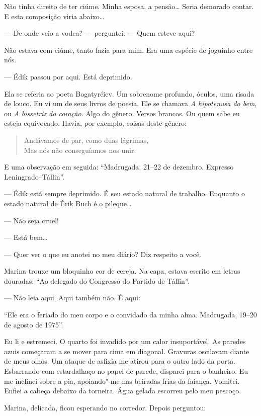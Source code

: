 Não tinha direito de ter ciúme. Minha esposa, a pensão\ldots{} Seria demorado
contar. E esta composição viria abaixo\ldots{}

--- De onde veio a vodca? --- perguntei. --- Quem esteve aqui?

Não estava com ciúme, tanto fazia para mim. Era uma espécie de joguinho
entre nós.

--- Édik passou por aqui. Está deprimido.

Ela se referia ao poeta Bogatyréiev. Um sobrenome profundo, óculos, uma
risada de louco. Eu vi um de seus livros de poesia. Ele se chamava
\emph{A hipotenusa do bem}, ou \emph{A bissetriz do coração}. Algo do
gênero. Versos brancos. Ou quem sabe eu esteja equivocado. Havia, por
exemplo, coisas deste gênero:

\begin{verse}
Andávamos de par, como duas lágrimas,\\
Mas nós não conseguíamos nos unir.
\end{verse}

E uma observação em seguida: ``Madrugada, 21--22 de dezembro. Expresso
Leningrado--Tállin''.

--- Édik está sempre deprimido. É seu estado natural de trabalho.
Enquanto o estado natural de Érik Buch é o pileque\ldots{}

--- Não seja cruel!

--- Está bem\ldots{}

--- Quer ver o que eu anotei no meu diário? Diz respeito a você.

Marina trouxe um bloquinho cor de cereja. Na capa, estava escrito em
letras douradas: ``Ao delegado do Congresso do Partido de Tállin''.

--- Não leia aqui. Aqui também não. É aqui:

``Ele era o feriado do meu corpo e o convidado da minha alma. Madrugada,
19--20 de agosto de 1975''.

Eu li e estremeci. O quarto foi invadido por um calor insuportável. As
paredes azuis começaram a se mover para cima em diagonal. Gravuras
oscilavam diante de meus olhos. Um ataque de asfixia me atirou para o
outro lado da porta. Esbarrando com estardalhaço no papel de parede,
disparei para o banheiro. Eu me inclinei sobre a pia, apoiando"-me nas
beiradas frias da faiança. Vomitei. Enfiei a cabeça debaixo da torneira.
Água gelada escorreu pelo meu pescoço.

Marina, delicada, ficou esperando no corredor. Depois perguntou:

